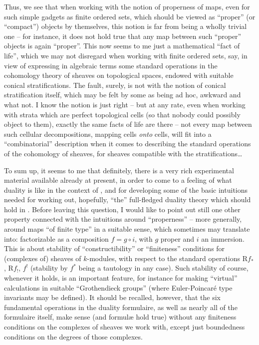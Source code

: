Thus, we see that when working with the notion of
properness of maps, even for such simple gadgets as finite ordered
sets, which should be viewed as ``proper'' (or ``compact'') objects by
themselves, this notion is far from being a wholly trivial one -- for
instance, it does not hold true that any map between such ``proper''
objects is again ``proper''. This now seems to me just a mathematical
``fact of life'', which we may not disregard when working with finite
ordered sets, say, in view of expressing in algebraic terms some
standard operations in the cohomology theory of sheaves on topological
spaces, endowed with suitable conical stratifications. The fault,
surely, is not with the notion of conical stratification itself, which
may be felt by some as being ad hoc, awkward and what not. I know the
notion is just right -- but at any rate, even when working with strata
which are perfect topological cells (so that nobody could possibly
object to them), exactly the same facts of life are there -- not every
map between such cellular decompositions, mapping cells \emph{onto}
cells, will fit into a ``combinatorial'' description when it comes to
describing the standard operations of the cohomology of sheaves, for
sheaves compatible with the stratifications\dots

To sum up, it seems to me that definitely, there is a very rich
experimental material available already at present, in order to come
to a feeling of what duality is like in the context of \Cat, and for
developing some of the basic intuitions needed for working out,
hopefully, ``the'' full-fledged duality theory which should hold in
\Cat. Before leaving this question, I would like to point out still
one other property connected with the intuitions around ``properness''
-- more generally, around maps ``of finite type'' in a suitable sense,
which sometimes may translate into: factorizable as a composition
$f=g\circ i$, with $g$ proper and $i$ an immersion. This is about
stability of ``constructibility'' or ``finiteness'' conditions for
(complexes of) sheaves of $k$-modules, with respect to the standard
operations $\mathrm Rf_*$, $\mathrm Rf_!$, $f^!$ (stability by $f^*$
being a tautology in any case). Such stability of course, whenever it
holds, is an important feature, for instance for making ``virtual''
calculations in suitable ``Grothendieck groups'' (where Euler-Poincaré
type invariants may be defined). It should be recalled, however, that
the six fundamental operations in the duality formulaire, as well as
nearly all of the formulaire itself, make sense (and formulæ hold
true) without any finiteness conditions on the complexes of sheaves we
work with, except just boundedness conditions on the degrees of those
complexes.

